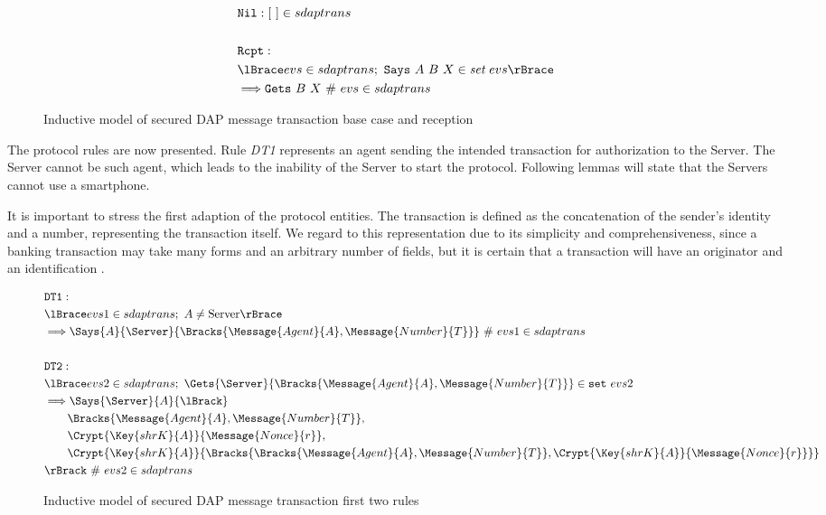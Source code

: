 \begin{figure}
  \begin{align*}
    & \texttt{Nil}: [ \ ] \in sdaptrans \\
    & \\
    & \texttt{Rcpt}: \newline \\
    & \lBrace evs \in sdaptrans;\ \texttt{Says} \ A \ B \ X \in \textit{set}\ evs \rBrace \\
    & \Longrightarrow \texttt{Gets} \ B \ X \ \#\ evs \in sdaptrans
  \end{align*}
  \label{fig:dap-model-0}
  \caption{Inductive model of secured DAP message transaction base case and reception}
\end{figure}

The protocol rules are now presented. Rule \textit{DT1} represents an agent sending the intended transaction for authorization to the Server. The Server cannot be such agent, which leads to the inability of the Server to start the protocol. Following lemmas will state that the Servers cannot use a smartphone.

It is important to stress the first adaption of the protocol entities. The transaction is defined as the concatenation of the sender's identity and a number, representing the transaction itself. We regard to this representation due to its simplicity and comprehensiveness, since a banking transaction may take many forms and an arbitrary number of fields, but it is certain that a transaction will have an originator and an identification \cite{Hutchinson2003}.

\begin{figure}[h!]
  \begin{align*}
    & \texttt{DT1}: \newline \\
    & \lBrace evs1 \in sdaptrans;\ A \neq \text{Server} \rBrace \\
    & \Longrightarrow \Says{A}{\Server}{\Bracks{\Message{Agent}{A}, \Message{Number}{T}}} \ \# \ evs1 \in sdaptrans \\
    & \\
    & \texttt{DT2}: \newline \\
    & \lBrace evs2 \in sdaptrans;\ \Gets{\Server}{\Bracks{\Message{Agent}{A}, \Message{Number}{T}}} \in \texttt{set} \ evs2 \\
    & \Longrightarrow \Says{\Server}{A}{\lBrack} \\
    & \qquad \Bracks{\Message{Agent}{A}, \Message{Number}{T}}, \\
    & \qquad \Crypt{\Key{shrK}{A}}{\Message{Nonce}{r}}, \\
    & \qquad \Crypt{\Key{shrK}{A}}{\Bracks{\Bracks{\Message{Agent}{A}, \Message{Number}{T}}, \Crypt{\Key{shrK}{A}}{\Message{Nonce}{r}}}} \\
    & \rBrack \ \# \ evs2 \in sdaptrans
  \end{align*}
  \caption{Inductive model of secured DAP message transaction first two rules}
  \label{fig:dap-model-1-n-2}
\end{figure}

